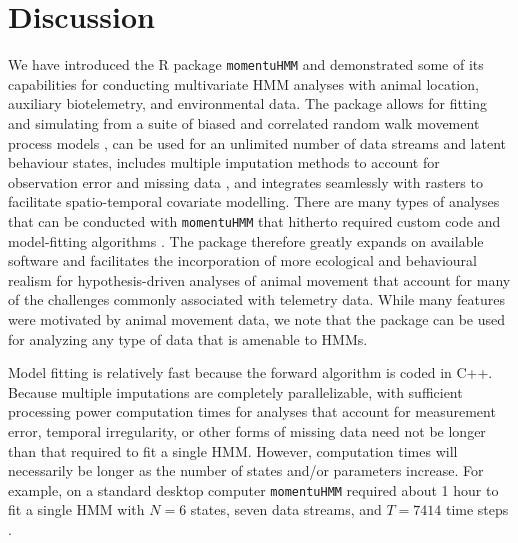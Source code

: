 \documentclass[12pt]{article}\usepackage[]{graphicx}\usepackage[]{color}
\begin{document}
\section{Discussion}
\label{sec:discuss}
We have introduced the R package \verb|momentuHMM| and demonstrated some of its capabilities for conducting multivariate HMM analyses with animal location, auxiliary biotelemetry, and environmental data. The package allows for fitting and simulating from a suite of biased and correlated random walk movement process models \citep[e.g.][]{McClintockEtAl2012}, can be used for an unlimited number of data streams and latent behaviour states, includes multiple imputation methods to account for observation error and missing data%
, and integrates seamlessly with rasters to facilitate spatio-temporal covariate modelling. There are many types of analyses that can be conducted with \verb|momentuHMM| that hitherto required custom code and model-fitting algorithms \citep[e.g.][Fig. \ref{fig:sesTracks}]{McClintockEtAl2013c,LangrockEtAl2014,MichelotEtAl2017}%
. The package therefore greatly expands on available software and facilitates the incorporation of more ecological and behavioural realism for hypothesis-driven analyses of animal movement that account for many of the challenges commonly associated with telemetry data. While many features were motivated by animal movement data, we note that the package can be used for analyzing any type of data that is amenable to HMMs.

Model fitting is relatively fast because the forward algorithm is coded in C++. Because multiple imputations are completely parallelizable, with sufficient processing power computation times for analyses that account for measurement error, temporal irregularity, or other forms of missing data need not be longer than that required to fit a single HMM.  However, computation times will necessarily be longer as the number of states and/or parameters increase. For example, on a standard desktop computer \verb|momentuHMM| required about 1 hour to fit a single HMM with $N=6$ states, seven data streams, and $T=7414$ time steps \citep{McClintock2017}.
\end{document}
